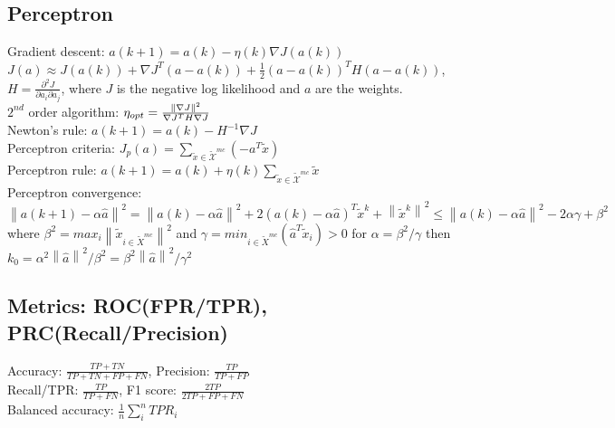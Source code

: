 \subsection*{Perceptron} 
Gradient descent: $a(k+1) = a(k) - \eta(k)\nabla J(a(k))$ \\
$J(a)\approx J(a(k))+\nabla J^T(a-a(k)) + \tfrac{1}{2}(a-a(k))^T H (a-a(k))$, $H{=}\frac{\partial^2 J}{\partial a_i \partial a_j}$, where $J$ is the negative log likelihood and $a$ are the weights.\\
$2^{nd}$ order algorithm: $\eta_{opt} = \frac{\left\lVert\nabla J\right\rVert^2}{\nabla J^T H \nabla J}$ \\
Newton's rule: $a(k+1){=}a(k){-}H^{{-}1}\nabla J$\\
Perceptron criteria: $J_p(a)=\sum_{\widetilde{x}\in\widetilde{\mathcal{X}}^{mc}} (-a^T \widetilde{x})$ \\
Perceptron rule: $a(k+1)=a(k)+\eta(k)\sum_{\widetilde{x}\in\widetilde{\mathcal{X}}^{mc}} \widetilde{x}$ \\
Perceptron convergence:$\left \| a(k+1)- \alpha \hat a \right \|^{2} = \left \| a(k)- \alpha \hat a \right \|^{2}  + 2(a(k)- \alpha \hat a)^{T} \tilde x^{k} + \left \| \tilde x^{k} \right \|^{2} \leq \left \| a(k)- \alpha \hat a \right \|^{2} -2\alpha \gamma + \beta ^{2}$
where $\beta^{2} = max_{i}  \left \| \tilde x_{i \in \tilde X^{mc} } \right \| ^{2}$ and $\gamma = min_{i \in \tilde X^{mc} } (\hat a^{T} \tilde x_{i}) > 0 $ for $\alpha= \beta^{2} / \gamma$  then $k_{0}= \alpha^{2}\left \|\hat a \right \|^{2} / \beta^{2}=  \beta^{2}\left \|\hat a \right \|^{2} / \gamma^{2}$

\subsection*{Metrics: ROC(FPR/TPR), PRC(Recall/Precision)}
Accuracy: $\frac{TP+TN}{TP+TN+FP+FN}$, Precision: $\frac{TP}{TP+FP}$\\ Recall/TPR: $\frac{TP}{TP+FN}$, F1 score: $\frac{2TP}{2TP+FP+FN}$\\
Balanced accuracy: $\frac{1}{n}\sum_i^n TPR_i$

